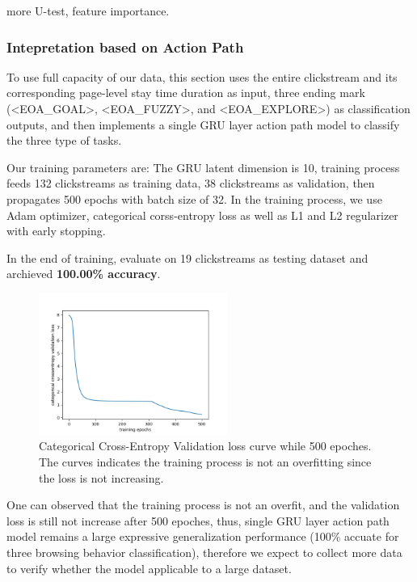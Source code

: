 more U-test, feature importance.

\subsubsection{Intepretation based on Action Path}
\label{sec:inter-action-path}

To use full capacity of our data, this section uses the entire clickstream and its corresponding
page-level stay time duration as input, three ending mark (<EOA\_GOAL>, <EOA\_FUZZY>, and <EOA\_EXPLORE>) 
as classification outputs, and then implements a single GRU layer action path model 
to classify the three type of tasks.

Our training parameters are: 
The GRU latent dimension is 10, training process feeds 132 clickstreams as training data,
38 clickstreams as validation, then 
propagates 500 epochs with batch size of 32. In the training process, we use Adam optimizer,
 categorical corss-entropy loss as well as L1 and L2 regularizer with early stopping.

In the end of training, evaluate on 19 clickstreams as testing dataset and 
archieved \textbf{100.00\% accuracy}.

\begin{figure}[H]
    \centering
    \includegraphics[width=0.55\textwidth]{figures/class-loss}
    \caption{Categorical Cross-Entropy Validation loss curve while 500 epoches. 
    The curves indicates the training process is not an overfitting since the loss is not increasing.}
    \label{fig:class-loss}
\end{figure}

One can observed that the training process is not an overfit, and the validation loss is 
still not increase after 500 epoches, thus, single GRU layer action path model 
remains a large expressive generalization performance 
(100\% accuate for three browsing behavior classification), therefore
we expect to collect more data to verify whether the model applicable to a large dataset.

